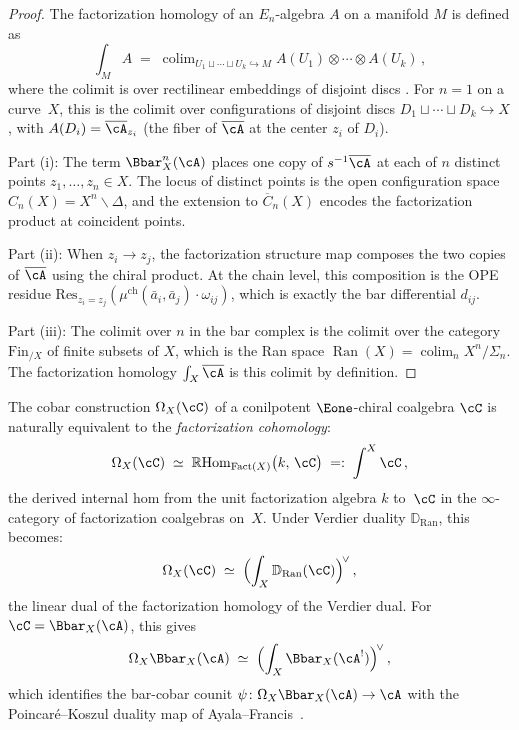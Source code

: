 \begin{proof}
The factorization homology of an $E_n$-algebra $A$ on a manifold
$M$ is defined as
\[
\textstyle\int_M A \;=\; \operatorname{colim}_{U_1 \sqcup \cdots
\sqcup U_k \hookrightarrow M} A(U_1) \otimes \cdots
\otimes A(U_k)\,,
\]
where the colimit is over rectilinear embeddings of disjoint discs
\cite[Definition~3.1]{AF15}.  For $n = 1$ on a curve~$X$, this is
the colimit over configurations of disjoint discs
$D_1 \sqcup \cdots \sqcup D_k \hookrightarrow X$, with
$A(D_i) = \overline{\cA}_{z_i}$ (the fiber of $\overline{\cA}$
at the center $z_i$ of $D_i$).

Part (i): The term $\Bbar^n_X(\cA)$ places one copy of
$s^{-1}\overline{\cA}$ at each of $n$ distinct points
$z_1, \ldots, z_n \in X$.  The locus of distinct points is the
open configuration space $C_n(X) = X^n \smallsetminus \Delta$,
and the extension to $\overline{C}_n(X)$ encodes the factorization
product at coincident points.

Part (ii): When $z_i \to z_j$, the factorization structure map
composes the two copies of $\overline{\cA}$ using the chiral
product.  At the chain level, this composition is the OPE residue
$\mathrm{Res}_{z_i = z_j}(\mu^{\mathrm{ch}}(\bar{a}_i, \bar{a}_j)
\cdot \omega_{ij})$, which is exactly the bar differential $d_{ij}$.

Part (iii): The colimit over $n$ in the bar complex is the colimit
over the category $\mathrm{Fin}_{/X}$ of finite subsets of $X$,
which is the Ran space $\operatorname{Ran}(X) =
\operatorname{colim}_n X^n/\Sigma_n$.  The factorization homology
$\int_X\overline{\cA}$ is this colimit by definition.
\end{proof}

\begin{proposition}
\label{prop:cobar-fh}
The cobar construction $\Omega_X(\cC)$ of a conilpotent
$\Eone$-chiral coalgebra $\cC$ is naturally equivalent to the
\emph{factorization cohomology}:
\[
\Omega_X(\cC) \;\simeq\;
\mathbb{R}\mathrm{Hom}_{\operatorname{Fact}(X)}
\bigl(k,\, \cC\bigr)
\;=:\;
\int^X \cC\,,
\]
the derived internal hom from the unit factorization algebra $k$
to~$\cC$ in the $\infty$-category of factorization coalgebras on~$X$.
Under Verdier duality $\mathbb{D}_{\mathrm{Ran}}$, this becomes:
\[
\Omega_X(\cC)
\;\simeq\;
\Bigl(\int_X \mathbb{D}_{\mathrm{Ran}}(\cC)\Bigr)^{\!\vee}\,,
\]
the linear dual of the factorization homology of the Verdier dual.
For $\cC = \Bbar_X(\cA)$, this gives
\[
\Omega_X\Bbar_X(\cA) \;\simeq\;
\Bigl(\int_X \Bbar_X(\cA^!)\Bigr)^{\!\vee}\,,
\]
which identifies the bar-cobar counit $\psi \colon
\Omega_X\Bbar_X(\cA) \to \cA$ with the Poincar\'e--Koszul duality
map of Ayala--Francis~\textup{\cite{AF15}}.
\end{proposition}

